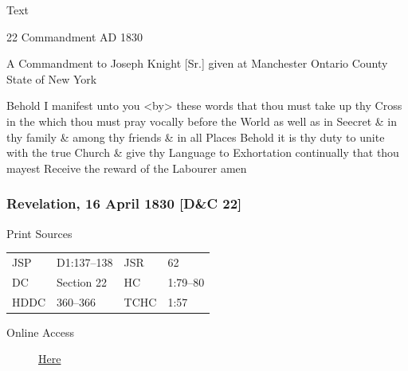 			
			\begin{description}
				\item[Text]
			\end{description}
			
				\begin{tightcenter}
				22 Commandment AD 1830
				\end{tightcenter}
				
				A Commandment to Joseph Knight [Sr.] given at Manchester Ontario County State of New York
				
				Behold I manifest unto you <by> these words that thou must take up thy Cross in the which thou must pray vocally before the World as well as in Seecret \& in thy family \& among thy friends \& in all Places Behold it is thy duty to unite with the true Church \& give thy Language to Exhortation continually that thou mayest Receive the reward of the Labourer amen
				
		\subsubsection{Revelation, 16 April 1830 [D\&C 22]}
			\label{EMS-1830-JS-16-APR-1830}
		
			\begin{description}
				\item[Print Sources]
			\end{description}

				\begin{tabular}{p{0.5in}p{1in}p{0.5in}p{1in}}
				JSP	 	& D1:137--138	& JSR 		& 62	 	\\
				DC	 	& Section 22	& HC 		& 1:79--80 	\\
				HDDC 	& 360--366		& TCHC 		& 1:57 		\\
				\end{tabular}
			
			\begin{description}
				\item[Online Access] \href{https://www.josephsmithpapers.org/paper-summary/revelation-16-april-1830-dc-22/1}{Here}
			\end{description}
			
